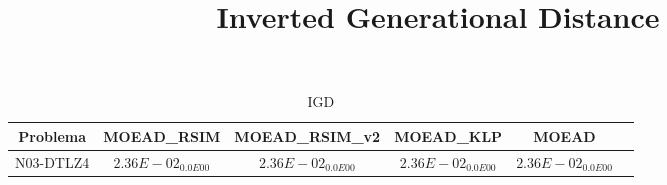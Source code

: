 \documentclass{article}
\title{Inverted Generational Distance}
\author{}
\begin{document}
\maketitle
\begin{table*}[ht!]
\scriptsize
\caption{IGD}
\centering\begin{tabular}{|c||c||c||c||c||c|} \hline
Problema &MOEAD_RSIM &MOEAD_RSIM_v2 &MOEAD_KLP &MOEAD\\\hline
N03-DTLZ4 &\cellcolor{gray95}$2.36E-02_{0.0E00}$ &\cellcolor{gray25}$2.36E-02_{0.0E00}$ &$2.36E-02_{0.0E00}$ &$2.36E-02_{0.0E00}$\\ 
\hline
\end{tabular}
\end{table*}
\end{document}
